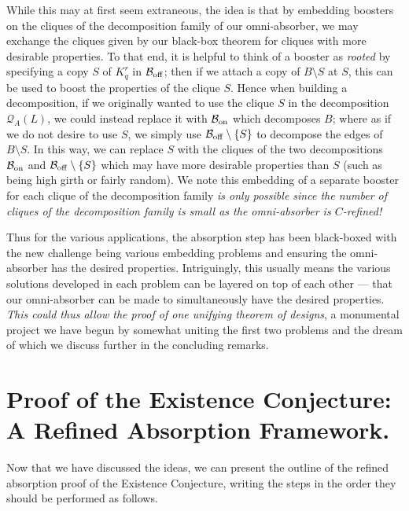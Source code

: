 \documentclass[twoside,leqno]{article}
\begin{document}
While this may at first seem extraneous, the idea is that by embedding boosters on the cliques of the decomposition family of our omni-absorber, we may exchange the cliques given by our black-box theorem for cliques with more desirable properties. To that end, it is helpful to think of a booster as \emph{rooted} by specifying a copy $S$ of $K_q^r$ in $\mathcal{B}_{\rm off}$; then if we attach a copy of $B\setminus S$ at $S$, this can be used to boost the properties of the clique $S$. Hence when building a decomposition, if we originally wanted to use the clique $S$ in the decomposition $\mathcal{Q}_A(L)$, we could instead replace it with $\mathcal{B}_{{\rm on}}$ which decomposes $B$; where as if we do not desire to use $S$, we simply use $\mathcal{B}_{\rm off}\setminus \{S\}$ to decompose the edges of $B\setminus S$. In this way, we can replace $S$ with the cliques of the two decompositions $\mathcal{B}_{\rm on}$ and $\mathcal{B}_{\rm off}\setminus \{S\}$ which may have more desirable properties than $S$ (such as being high girth or fairly random). We note this embedding of a separate booster for each clique of the decomposition family \emph{is only possible since the number of cliques of the decomposition family is small as the omni-absorber is $C$-refined!}

Thus for the various applications, the absorption step has been black-boxed with the new challenge being various embedding problems and ensuring the omni-absorber has the desired properties. Intriguingly, this usually means the various solutions developed in each problem can be layered on top of each other --- that our omni-absorber can be made to simultaneously have the desired properties. \emph{This could thus allow the proof of one unifying theorem of designs}, a monumental project we have begun by somewhat uniting the first two problems and the dream of which we discuss further in the concluding remarks.

\section{Proof of the Existence Conjecture: A Refined Absorption Framework.}

Now that we have discussed the ideas, we can present the outline of the refined absorption proof of the Existence Conjecture, writing the steps in the order they should be performed as follows. 
\end{document}
